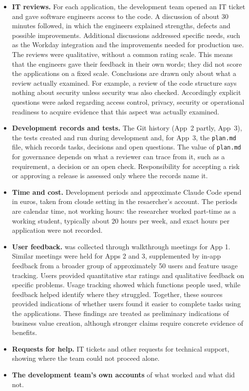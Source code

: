 \documentclass[10pt,a4paper]{article}
\begin{document}
\begin{itemize}
    \item \textbf{IT reviews.} For each application, the development
    team opened an IT ticket and gave software engineers access to the
    code. A discussion of about 30 minutes followed, in which the
    engineers explained strengths, defects and possible improvements.
    Additional discussions addressed specific needs, such as the
    Workday integration and the improvements needed for production use.  
    The reviews were qualitative, without a common rating scale. This means that the engineers gave their feedback in their own words; they did not
    score the applications on a fixed scale. Conclusions are drawn only
    about what a review actually examined. For example, a review of the
    code structure says nothing about security unless security was also
    checked. Accordingly explicit questions were asked regarding  access control, privacy, security or operational
    readiness to acquire evidence that this aspect was actually examined.


    \item \textbf{Development records and tests.} The Git history
    (App~2 partly, App~3), the tests created and run during development
    and, for App~3, the \texttt{plan.md} file, which records tasks,
    decisions and open questions. The value of \texttt{plan.md} for
    governance depends on what a reviewer can trace from it, such as a
    requirement, a decision or an open check. Responsibility for
    accepting a risk or approving a release is assessed only where the
    records name it.
    \item \textbf{Time and cost.} Development periods and approximate
    Claude Code spend in euros, taken from cloude setting in the resaercher's account. The periods are
    calendar time, not working hours: the researcher worked part-time
    as a working student, typically about 20 hours per week, and exact
    hours per application were not recorded.
    \item \textbf{User feedback.} was collected through walkthrough meetings for App 1. Similar meetings were held for Apps 2 and 3, supplemented by in-app feedback from a broader group of approximately 50 users and feature usage tracking. Users provided quantitative star ratings and qualitative feedback on specific problems. Usage tracking showed which functions people used, while feedback helped identify where they struggled. Together, these sources provided indications of whether users found it easier to complete tasks using the applications. These findings are treated as preliminary indications of business value creation, although stronger claims require concrete evidence of benefits.
    \item \textbf{Requests for help.} IT tickets and other requests for
    technical support, showing where the team could not proceed alone.
    \item \textbf{The development team's own accounts} of what worked
    and what did not.
\end{itemize}
 
\end{document}
